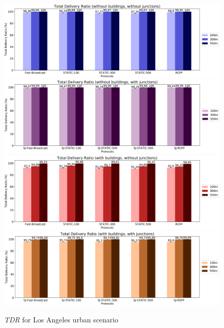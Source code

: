 		\begin{figure}[H]
			\centering
			\includegraphics[width=1.0\textwidth]{immagini/la-25/b0/j0/tdr}
			\includegraphics[width=1.0\textwidth]{immagini/la-25/b0/j1/tdr}
			\includegraphics[width=1.0\textwidth]{immagini/la-25/b1/j0/tdr}
			\includegraphics[width=1.0\textwidth]{immagini/la-25/b1/j1/tdr}
			\caption{\textit{TDR} for Los Angeles urban scenario}
			\label{fig:la-25-tdr}
		\end{figure}
	
